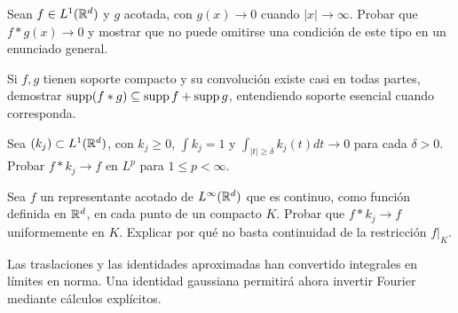 \begin{ejercicio}\label{ej:v4-l09-2}
Sean $f\in L^1(\mathbb R^d)$ y $g$ acotada, con $g(x)\to0$ cuando $|x|\to\infty$. Probar que $f*g(x)\to0$ y mostrar que no puede omitirse una condición de este tipo en un enunciado general.
\end{ejercicio}

\begin{ejercicio}\label{ej:v4-l09-3}
Si $f,g$ tienen soporte compacto y su convolución existe casi en todas partes, demostrar $\operatorname{supp}(f*g)\subseteq\operatorname{supp} f+\operatorname{supp} g$, entendiendo soporte esencial cuando corresponda.
\end{ejercicio}

\begin{ejercicio}\label{ej:v4-l09-4}
Sea $(k_j)\subset L^1(\mathbb R^d)$, con $k_j\geq0$, $\int k_j=1$ y $\int_{|t|\geq\delta}k_j(t)dt\to0$ para cada $\delta>0$. Probar $f*k_j\to f$ en $L^p$ para $1\leq p<\infty$.
\end{ejercicio}

\begin{ejercicio}\label{ej:v4-l09-5}
Sea $f$ un representante acotado de $L^\infty(\mathbb R^d)$ que es continuo, como función definida en $\mathbb R^d$, en cada punto de un compacto $K$. Probar que $f*k_j\to f$ uniformemente en $K$. Explicar por qué no basta continuidad de la restricción $f|_K$.
\end{ejercicio}


Las traslaciones y las identidades aproximadas han convertido integrales en límites en norma. Una identidad gaussiana permitirá ahora invertir Fourier mediante cálculos explícitos.
